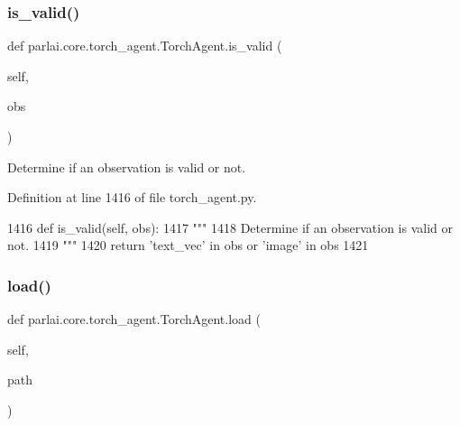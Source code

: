\mbox{\label{classparlai_1_1core_1_1torch__agent_1_1TorchAgent_afa491bf2384b017711ad722b5341b405}} 
\subsubsection{\texorpdfstring{is\+\_\+valid()}{is\_valid()}}
{\footnotesize\ttfamily def parlai.\+core.\+torch\+\_\+agent.\+Torch\+Agent.\+is\+\_\+valid (\begin{DoxyParamCaption}\item[{}]{self,  }\item[{}]{obs }\end{DoxyParamCaption})}

\begin{DoxyVerb}Determine if an observation is valid or not.
\end{DoxyVerb}
 

Definition at line 1416 of file torch\+\_\+agent.\+py.


\begin{DoxyCode}
1416     \textcolor{keyword}{def }is\_valid(self, obs):
1417         \textcolor{stringliteral}{"""}
1418 \textcolor{stringliteral}{        Determine if an observation is valid or not.}
1419 \textcolor{stringliteral}{        """}
1420         \textcolor{keywordflow}{return} \textcolor{stringliteral}{'text\_vec'} \textcolor{keywordflow}{in} obs \textcolor{keywordflow}{or} \textcolor{stringliteral}{'image'} \textcolor{keywordflow}{in} obs
1421 
\end{DoxyCode}
\mbox{\label{classparlai_1_1core_1_1torch__agent_1_1TorchAgent_ac345f2da892d35d9f4921e0acf5594c8}} 
\subsubsection{\texorpdfstring{load()}{load()}}
{\footnotesize\ttfamily def parlai.\+core.\+torch\+\_\+agent.\+Torch\+Agent.\+load (\begin{DoxyParamCaption}\item[{}]{self,  }\item[{}]{path }\end{DoxyParamCaption})}



